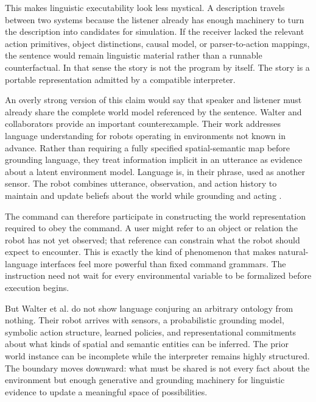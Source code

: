 \documentclass[11pt]{article}
\begin{document}
This makes linguistic executability look less mystical. A description travels between two systems because the listener already has enough machinery to turn the description into candidates for simulation. If the receiver lacked the relevant action primitives, object distinctions, causal model, or parser-to-action mappings, the sentence would remain linguistic material rather than a runnable counterfactual. In that sense the story is not the program by itself. The story is a portable representation admitted by a compatible interpreter.

An overly strong version of this claim would say that speaker and listener must already share the complete world model referenced by the sentence. Walter and collaborators provide an important counterexample. Their work addresses language understanding for robots operating in environments not known in advance. Rather than requiring a fully specified spatial-semantic map before grounding language, they treat information implicit in an utterance as evidence about a latent environment model. Language is, in their phrase, used as another sensor. The robot combines utterance, observation, and action history to maintain and update beliefs about the world while grounding and acting \parencite{walter2021language}.

The command can therefore participate in constructing the world representation required to obey the command. A user might refer to an object or relation the robot has not yet observed; that reference can constrain what the robot should expect to encounter. This is exactly the kind of phenomenon that makes natural-language interfaces feel more powerful than fixed command grammars. The instruction need not wait for every environmental variable to be formalized before execution begins.

But Walter et al. do not show language conjuring an arbitrary ontology from nothing. Their robot arrives with sensors, a probabilistic grounding model, symbolic action structure, learned policies, and representational commitments about what kinds of spatial and semantic entities can be inferred. The prior world instance can be incomplete while the interpreter remains highly structured. The boundary moves downward: what must be shared is not every fact about the environment but enough generative and grounding machinery for linguistic evidence to update a meaningful space of possibilities.
\end{document}
